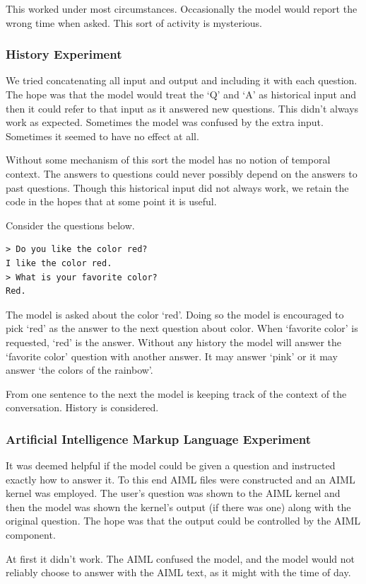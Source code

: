 This worked under most circumstances. Occasionally the model would report the wrong time when asked. This sort of activity is mysterious.

\subsubsection{History Experiment}
We tried concatenating all input and output and including it with each question. The hope was that the model would treat the `Q' and `A' as historical input and then it could refer to that input as it answered new questions. This didn't always work as expected. Sometimes the model was confused by the extra input. Sometimes it seemed to have no effect at all.

Without some mechanism of this sort the model has no notion of temporal context. The answers to questions could never possibly depend on the answers to past questions. Though this historical input did not always work, we retain the code in the hopes that at some point it is useful.

Consider the questions below.
\begin{verbatim}
> Do you like the color red?
I like the color red.
> What is your favorite color?
Red.
\end{verbatim}
The model is asked about the color `red'. Doing so the model is encouraged to pick `red' as the answer to the next question about color. When `favorite color' is requested, `red' is the answer. Without any history the model will answer the `favorite color' question with another answer. It may answer `pink' or it may answer `the colors of the rainbow'. 

From one sentence to the next the model is keeping track of the context of the conversation. History is considered.

\subsubsection{Artificial Intelligence Markup Language Experiment}
It was deemed helpful if the model could be given a question and instructed exactly how to answer it. To this end AIML files were constructed and an AIML kernel was employed. The user's question was shown to the AIML kernel and then the model was shown the kernel's output (if there was one) along with the original question. The hope was that the output could be controlled by the AIML component. 

At first it didn't work. The AIML confused the model, and the model would not reliably choose to answer with the AIML text, as it might with the time of day.

